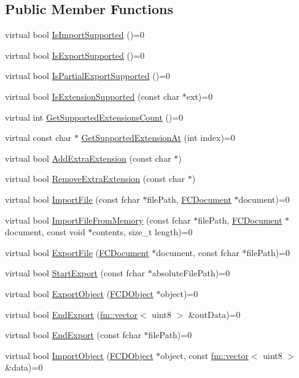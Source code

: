 \subsection*{Public Member Functions}
\begin{DoxyCompactItemize}
\item 
virtual bool \hyperlink{classFCPArchive_aa0b2959b608384df6886b4aa7ee86986}{IsImportSupported} ()=0
\item 
virtual bool \hyperlink{classFCPArchive_aa05c42f9060a8e15e49b49444475e4fd}{IsExportSupported} ()=0
\item 
virtual bool \hyperlink{classFCPArchive_ac8098f0eee6da0e452e005993a994a34}{IsPartialExportSupported} ()=0
\item 
virtual bool \hyperlink{classFCPArchive_aaab914c16d1f875202a345655de3da56}{IsExtensionSupported} (const char $\ast$ext)=0
\item 
virtual int \hyperlink{classFCPArchive_a20d84d32ee7f7fd24f1e5a2bfa18c641}{GetSupportedExtensionsCount} ()=0
\item 
virtual const char $\ast$ \hyperlink{classFCPArchive_a0ff34fd40e2df3f2521ff7f3c3ec9c3a}{GetSupportedExtensionAt} (int index)=0
\item 
virtual bool \hyperlink{classFCPArchive_a94f402ab481e8ac8934de6869ea03902}{AddExtraExtension} (const char $\ast$)
\item 
virtual bool \hyperlink{classFCPArchive_a7127cef7e60e6828a3bc5c3016adf058}{RemoveExtraExtension} (const char $\ast$)
\item 
virtual bool \hyperlink{classFCPArchive_a039a693760cc352763c1f4ef4b6b1e1e}{ImportFile} (const fchar $\ast$filePath, \hyperlink{classFCDocument}{FCDocument} $\ast$document)=0
\item 
virtual bool \hyperlink{classFCPArchive_a5cb561c22100b8a80f2c377cd777743d}{ImportFileFromMemory} (const fchar $\ast$filePath, \hyperlink{classFCDocument}{FCDocument} $\ast$document, const void $\ast$contents, size\_\-t length)=0
\item 
virtual bool \hyperlink{classFCPArchive_ad8450f07eca641209d2528f6e192b738}{ExportFile} (\hyperlink{classFCDocument}{FCDocument} $\ast$document, const fchar $\ast$filePath)=0
\item 
virtual bool \hyperlink{classFCPArchive_a7d142d1ca5e47da608eb3257ae3f36ab}{StartExport} (const fchar $\ast$absoluteFilePath)=0
\item 
virtual bool \hyperlink{classFCPArchive_af61f5a312713e2d3103bc803bf1df5ac}{ExportObject} (\hyperlink{classFCDObject}{FCDObject} $\ast$object)=0
\item 
virtual bool \hyperlink{classFCPArchive_aa241d796f8be01183eabe8d5f1b3216f}{EndExport} (\hyperlink{classfm_1_1vector}{fm::vector}$<$ uint8 $>$ \&outData)=0
\item 
virtual bool \hyperlink{classFCPArchive_ad252bed74284e1615cbfdfdcba054250}{EndExport} (const fchar $\ast$filePath)=0
\item 
virtual bool \hyperlink{classFCPArchive_a269b13b7c24086b5220fc81b1a08e173}{ImportObject} (\hyperlink{classFCDObject}{FCDObject} $\ast$object, const \hyperlink{classfm_1_1vector}{fm::vector}$<$ uint8 $>$ \&data)=0
\end{DoxyCompactItemize}

